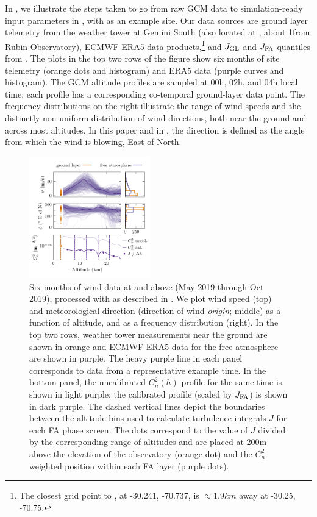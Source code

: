 \documentclass[twocolumn]{aastex631}
\begin{document}
In , we illustrate the steps taken to go from raw GCM data to simulation-ready input parameters in \psfws, with \cp as an example site.
Our data sources are ground layer telemetry from the weather tower at Gemini South (also located at \cp, about 1\km from Rubin Observatory), ECMWF ERA5 data products,\footnote{The closest grid point to \cp, at -30.241, -70.737, is $\approx 1.9\unit{km}$ away at -30.25, -70.75.} and $J_{\rm GL}$ and $J_{\rm FA}$ quantiles from \cite{tokovinin_model_2005}. 
The plots in the top two rows of the figure show six months of site telemetry (orange dots and histogram) and ERA5 data (purple curves and histogram). 
The GCM altitude profiles are sampled at 00h, 02h, and 04h local time; each profile has a corresponding co-temporal ground-layer data point.
The frequency distributions on the right illustrate the range of wind speeds and the distinctly non-uniform distribution of wind directions, both near the ground and across most altitudes.
In this paper and in \psfws, the direction is defined as the angle from which the wind is blowing, East of North. 


\begin{figure}
\includegraphics[width=0.47\textwidth]{f2_data.png}
\caption{
    Six months of wind data at and above \cp (May 2019 through  Oct 2019), processed with \psfws as described in .
    We plot wind speed (top) and meteorological direction (direction of wind \textsl{origin}; middle) as a function of altitude, and as a frequency distribution (right). 
    In the top two rows, weather tower measurements near the ground are shown in orange and ECMWF ERA5 data for the free atmosphere are shown in purple.
    The heavy purple line in each panel corresponds to data from a representative example time.
    In the bottom panel, the uncalibrated $C_n^2(h)$ profile for the same time is shown in light purple; the calibrated profile (scaled by $J_{\rm FA}$) is shown in dark purple. 
    The dashed vertical lines depict the boundaries between the altitude bins used to calculate turbulence integrals $J$ for each FA phase screen.
    The dots correspond to the value of $J$ divided by the corresponding range of altitudes and are placed at 200\unit{m} above the elevation of the observatory (orange dot) and the $C_n^2$-weighted position within each FA layer (purple dots).
    \label{fig:inputs}
    }
\end{figure}
\end{document}
